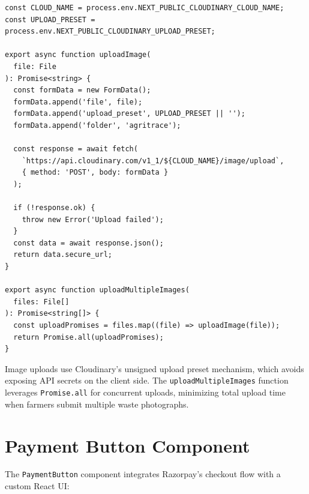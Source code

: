 \documentclass[a4paper,12pt,oneside]{report}
\begin{document}
\begin{lstlisting}[caption={Storage Service (storage-service.ts)}, label={lst:storage}]
const CLOUD_NAME = process.env.NEXT_PUBLIC_CLOUDINARY_CLOUD_NAME;
const UPLOAD_PRESET = process.env.NEXT_PUBLIC_CLOUDINARY_UPLOAD_PRESET;

export async function uploadImage(
  file: File
): Promise<string> {
  const formData = new FormData();
  formData.append('file', file);
  formData.append('upload_preset', UPLOAD_PRESET || '');
  formData.append('folder', 'agritrace');

  const response = await fetch(
    `https://api.cloudinary.com/v1_1/${CLOUD_NAME}/image/upload`,
    { method: 'POST', body: formData }
  );

  if (!response.ok) {
    throw new Error('Upload failed');
  }
  const data = await response.json();
  return data.secure_url;
}

export async function uploadMultipleImages(
  files: File[]
): Promise<string[]> {
  const uploadPromises = files.map((file) => uploadImage(file));
  return Promise.all(uploadPromises);
}
\end{lstlisting}

\noindent Image uploads use Cloudinary's unsigned upload preset mechanism, which avoids exposing API secrets on the client side. The \texttt{uploadMultipleImages} function leverages \texttt{Promise.all} for concurrent uploads, minimizing total upload time when farmers submit multiple waste photographs.

\section{Payment Button Component}

\noindent The \texttt{PaymentButton} component integrates Razorpay's checkout flow with a custom React UI:
\end{document}
